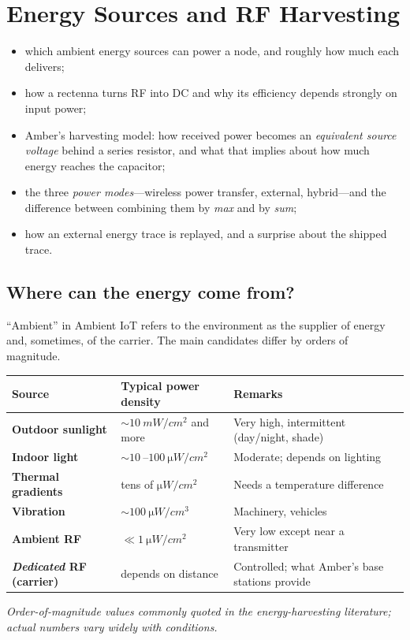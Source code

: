 \chapter{Energy Sources and RF Harvesting}
\label{ch:harvest}

\begin{defbox}
\begin{itemize}
 \item which ambient energy sources can power a node, and roughly how much each delivers;
 \item how a rectenna turns RF into DC and why its efficiency depends strongly on input power;
 \item Amber's harvesting model: how received power becomes an \emph{equivalent source voltage} behind a series resistor, and what that implies about how much energy reaches the capacitor;
 \item the three \emph{power modes}---wireless power transfer, external, hybrid---and the difference between combining them by \emph{max} and by \emph{sum};
 \item how an external energy trace is replayed, and a surprise about the shipped trace.
\end{itemize}
\end{defbox}

\section{Where can the energy come from?}
\label{sec:sources}

``Ambient'' in Ambient IoT refers to the environment as the supplier of energy
and, sometimes, of the carrier. The main candidates differ by orders of magnitude.

\begin{center}
\small
\renewcommand{\arraystretch}{1.15}
\begin{tabularx}{\linewidth}{@{}>{\sffamily\bfseries}p{3.4cm}>{\raggedright}p{3.8cm}X@{}}
\toprule
Source & Typical power density & Remarks\\
\midrule
Outdoor sunlight & $\sim\SI{10}{mW/cm^2}$ and more & Very high, intermittent (day/night, shade)\\
Indoor light & $\sim\SI{10}{}$--$\SI{100}{\micro W/cm^2}$ & Moderate; depends on lighting\\
Thermal gradients & tens of $\si{\micro W/cm^2}$ & Needs a temperature difference\\
Vibration & $\sim\SI{100}{\micro W/cm^3}$ & Machinery, vehicles\\
Ambient RF & $\ll\SI{1}{\micro W/cm^2}$ & Very low except near a transmitter\\
\emph{Dedicated} RF (carrier) & depends on distance & Controlled; what Amber's base stations provide\\
\bottomrule
\end{tabularx}
\end{center}
\noindent\emph{Order-of-magnitude values commonly quoted in the energy-harvesting literature; actual numbers vary widely with conditions.}

